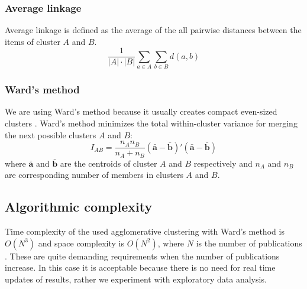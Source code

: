 \subsubsection{Average linkage}
Average linkage is defined as the average of the all pairwise 
distances between the items of cluster $A$ and $B$.
\begin{equation}
 \frac{1}{|A| \cdot |B|} \sum_{a \in A} \sum_{b \in B}d(a,b)
\end{equation}

\subsubsection{Ward's method}
We are using Ward's method because it usually creates compact 
even-sized clusters \cite{strauss_generalising_2017}. Ward's 
method minimizes the total within-cluster variance for merging 
the next possible clusters $A$ and $B$:
\begin{equation}
 I_{AB} = \frac{n_A n_B}{n_A + n_B} (\bar{\textbf{a}} - \bar{\textbf{b}})'(\bar{\textbf{a}}-\bar{\textbf{b}})
\end{equation}
where $\bar{\textbf{a}}$ and $\bar{\textbf{b}}$ are the centroids
of cluster $A$ and $B$ respectively and $n_A$ and $n_B$ are
corresponding number of members in clusters $A$ and $B$.


\subsection{Algorithmic complexity}
Time complexity of the used agglomerative clustering with Ward's 
method is $O(N^3)$ and space complexity is $O(N^2)$, 
where $N$ is the number of publications 
\cite{willett_recent_1988}. These are quite demanding requirements
when the number of publications increase. In this case it is 
acceptable because there is no need for real time updates of 
results, rather we experiment with exploratory data analysis.



